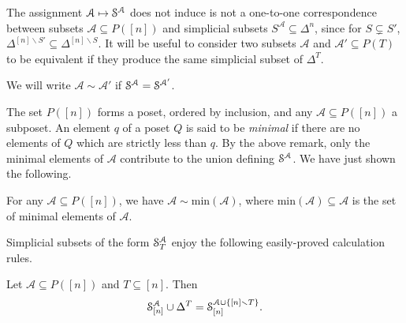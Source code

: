 \documentclass[main.tex]{subfiles}
\begin{document}
The assignment $\mathcal{A} \mapsto \S^{\mathcal{A}}$ does not induce is not a one-to-one correspondence between subsets $\mathcal{A} \subseteq P([n])$ and simplicial subsets $S^{\mathcal{A}} \subseteq \Delta^{n}$, since for $S \subsetneq S'$, $\Delta^{[n] \smallsetminus S'} \subseteq \Delta^{[n] \smallsetminus S}$. It will be useful to consider two subsets $\mathcal{A}$ and $\mathcal{A}' \subseteq P(T)$ to be equivalent if they produce the same simplicial subset of $\Delta^{T}$.

\begin{notation}
  We will write $\mathcal{A} \sim \mathcal{A}'$ if $\S^{\mathcal{A}} = \S^{\mathcal{A}'}$. 
\end{notation}

The set $P([n])$ forms a poset, ordered by inclusion, and any $\mathcal{A} \subseteq P([n])$ a subposet. An element $q$ of a poset $Q$ is said to be \emph{minimal} if there are no elements of $Q$ which are strictly less than $q$. By the above remark, only the minimal elements of $\mathcal{A}$ contribute to the union defining $\S^{\mathcal{A}}$. We have just shown the following.

\begin{lemma}
  \label{lemma:replace_poset_by_minimal_elements}
  For any $\mathcal{A} \subseteq P([n])$, we have $\mathcal{A} \sim \mathrm{min}(\mathcal{A})$, where $\mathrm{min}(\mathcal{A}) \subseteq \mathcal{A}$ is the set of minimal elements of $\mathcal{A}$.
\end{lemma}

Simplicial subsets of the form $\S^{\mathcal{A}}_{T}$ enjoy the following easily-proved calculation rules.

\begin{lemma}
  \label{lemma:add_a_simplex}
  Let $\mathcal{A} \subseteq P([n])$ and $T \subseteq [n]$. Then
  \begin{equation*}
    \S^{\mathcal{A}}_{[n]} \cup \Delta^{T} = \S^{\mathcal{A} \cup \{[n] \smallsetminus T\}}_{[n]}.
  \end{equation*}
\end{lemma}
\end{document}
